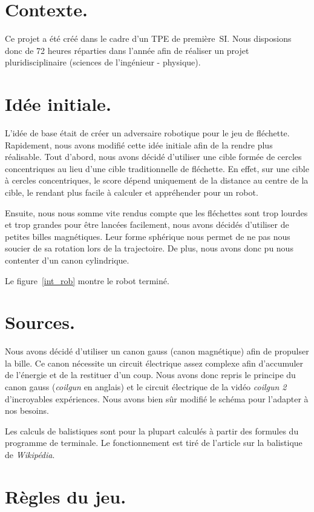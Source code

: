 \section{Contexte.}
Ce projet a été créé dans le cadre d'un TPE de première\ SI. Nous disposions donc de 72 heures réparties dans l'année afin de réaliser un projet pluridisciplinaire (sciences de l'ingénieur - physique).

\section{Idée initiale.}
L'idée de base était de créer un adversaire robotique pour le jeu de fléchette. Rapidement, nous avons modifié cette idée initiale afin de la rendre plus réalisable. Tout d'abord, nous avons décidé d'utiliser une cible formée de cercles concentriques au lieu d'une cible traditionnelle de fléchette. En effet, sur une cible à cercles concentriques, le score dépend uniquement de la distance au centre de la cible, le rendant plus facile à calculer et appréhender pour un robot.

Ensuite, nous nous somme vite rendus compte que les fléchettes sont trop lourdes et trop grandes pour être lancées facilement, nous avons décidés d'utiliser de petites billes magnétiques. Leur forme sphérique nous permet de ne pas nous soucier de sa rotation lors de la trajectoire. De plus, nous avons donc pu nous contenter d'un canon cylindrique.

Le figure~\ref{int_rob} montre le robot terminé.

\section{Sources.}
Nous avons décidé d'utiliser un canon gauss (canon magnétique) afin de propulser la bille. Ce canon nécessite un circuit électrique assez complexe afin d'accumuler de l'énergie et de la restituer d'un coup. Nous avons donc repris le principe du canon gauss (\emph{coilgun} en anglais) et le circuit électrique de la vidéo \emph{coilgun 2} d'incroyables expériences. Nous avons bien sûr modifié le schéma pour l'adapter à nos besoins.

Les calculs de balistiques sont pour la plupart calculés à partir des formules du programme de terminale. Le fonctionnement est tiré de l'article sur la balistique de \emph{Wikipédia}.

\section{Règles du jeu.} \label{regles}
